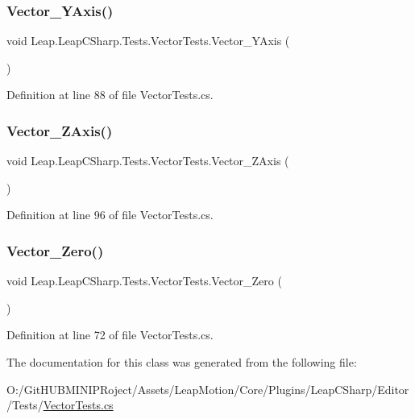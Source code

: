 \subsubsection{\texorpdfstring{Vector\_YAxis()}{Vector\_YAxis()}}
{\footnotesize\ttfamily void Leap.\+Leap\+C\+Sharp.\+Tests.\+Vector\+Tests.\+Vector\+\_\+\+Y\+Axis (\begin{DoxyParamCaption}{ }\end{DoxyParamCaption})}



Definition at line 88 of file Vector\+Tests.\+cs.

\mbox{\label{class_leap_1_1_leap_c_sharp_1_1_tests_1_1_vector_tests_ab50fa4d4319b0a65fefff7ad9d7658be}} 
\subsubsection{\texorpdfstring{Vector\_ZAxis()}{Vector\_ZAxis()}}
{\footnotesize\ttfamily void Leap.\+Leap\+C\+Sharp.\+Tests.\+Vector\+Tests.\+Vector\+\_\+\+Z\+Axis (\begin{DoxyParamCaption}{ }\end{DoxyParamCaption})}



Definition at line 96 of file Vector\+Tests.\+cs.

\mbox{\label{class_leap_1_1_leap_c_sharp_1_1_tests_1_1_vector_tests_a10859fd21599d27a97aa2d435d07917f}} 
\subsubsection{\texorpdfstring{Vector\_Zero()}{Vector\_Zero()}}
{\footnotesize\ttfamily void Leap.\+Leap\+C\+Sharp.\+Tests.\+Vector\+Tests.\+Vector\+\_\+\+Zero (\begin{DoxyParamCaption}{ }\end{DoxyParamCaption})}



Definition at line 72 of file Vector\+Tests.\+cs.



The documentation for this class was generated from the following file\+:\begin{DoxyCompactItemize}
\item 
O\+:/\+Git\+H\+U\+B\+M\+I\+N\+I\+P\+Roject/\+Assets/\+Leap\+Motion/\+Core/\+Plugins/\+Leap\+C\+Sharp/\+Editor/\+Tests/\mbox{\hyperlink{_vector_tests_8cs}{Vector\+Tests.\+cs}}\end{DoxyCompactItemize}
